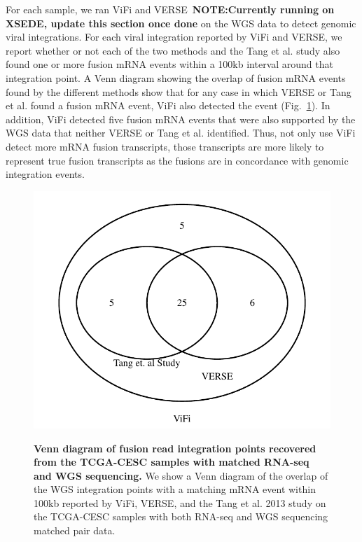 \documentclass[11pt]{article}
\begin{document}
For each sample, we ran ViFi and VERSE~\textbf{NOTE:Currently running on XSEDE, update this section once done} on the WGS data to detect genomic viral integrations.  For each viral integration reported by ViFi and VERSE, we report whether or not each of the two methods and the Tang et al. study also found one or more fusion mRNA events within a 100kb interval around that integration point.  A Venn diagram showing the overlap of fusion mRNA events found by the different methods show that for any case in which VERSE or Tang et al. found a fusion mRNA event, ViFi also detected the event (Fig.~\ref{venn_diagram}).  In addition, ViFi detected five fusion mRNA events that were also supported by the WGS data that neither VERSE or Tang et al. identified.  Thus, not only use ViFi detect more mRNA fusion transcripts, those transcripts are more likely to represent true fusion transcripts as the fusions are in concordance with genomic integration events. %

\begin{figure}[htpb]
  \centering
  \includegraphics[width=1\linewidth]{results/tcga_triple.pdf}\\
\caption[Venn diagram of fusion reads recovered from the RNA-seq data from Larsson 2013 study]
{\label{venn_diagram}  {\bf Venn diagram of fusion read integration points recovered from the TCGA-CESC samples with matched RNA-seq and WGS sequencing.}  We show a Venn diagram of the overlap of the WGS integration points with a matching mRNA event within 100kb reported by ViFi, VERSE, and the Tang et al. 2013 study on the TCGA-CESC samples with both RNA-seq and WGS sequencing matched pair data.  }
\end{figure}
\end{document}
